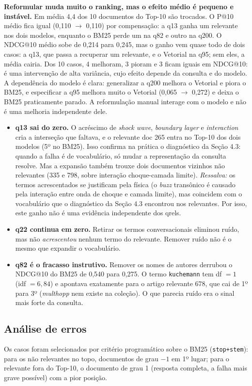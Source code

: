 \documentclass[10pt,a4paper]{article}
\newcommand{\term}[1]{\texttt{#1}}         %
\begin{document}
\textbf{Reformular muda muito o ranking, mas o efeito médio é pequeno e instável.} Em média 4,4
dos 10 documentos do Top-10 são trocados. O P@10 médio fica igual (0,110 $\to$ 0,110) por
compensação: a q13 ganha um relevante nos dois modelos, enquanto o BM25 perde um na q82 e outro
na q200. O NDCG@10 médio sobe de 0,214 para 0,245, mas o ganho vem quase todo de dois casos: a
q13, que passa a recuperar um relevante, e o Vetorial na q95; sem eles, a média cairia. Dos 10
casos, 4 melhoram, 3 pioram e 3 ficam iguais em NDCG@10: é uma intervenção de alta variância, cujo
efeito depende da consulta e do modelo. A dependência do modelo é clara: generalizar a q200
melhora o Vetorial e piora o BM25, e especificar a q95 melhora muito o Vetorial
(0,065 $\to$ 0,272) e deixa o BM25 praticamente parado. A reformulação manual interage com o
modelo e não é uma melhoria independente dele.
\begin{itemize}
  \item \textbf{q13 sai do zero.} O acréscimo de \emph{shock wave}, \emph{boundary layer} e
  \emph{interaction} cria a interseção que faltava, e o relevante doc 265 entra no Top-10 dos dois
  modelos (5º no BM25). Isso confirma na prática o diagnóstico da Seção 4.3: quando a falha é de
  vocabulário, só mudar a representação da consulta resolve. Mas a expansão também trouxe dois
  documentos vizinhos não relevantes (335 e 798, sobre interação choque-camada limite).
  \emph{Ressalva:} os termos acrescentados se justificam pela física (o \emph{buzz} transônico é
  causado pela interação entre onda de choque e camada limite), mas coincidem com o vocabulário que
  o diagnóstico da Seção 4.3 encontrou nos relevantes. Por isso, este ganho não é uma evidência
  independente dos qrels.
  \item \textbf{q22 continua em zero.} Retirar os termos conversacionais eliminou ruído, mas não
  \emph{acrescentou} nenhum termo do relevante. Remover ruído não é o mesmo que expandir o
  vocabulário.
  \item \textbf{q82 é o fracasso instrutivo.} Remover os nomes de autores derrubou o NDCG@10 do
  BM25 de 0,540 para 0,275. O termo \term{kuchemann} tem df $=1$ (idf $=6{,}84$) e apontava
  exatamente para o artigo relevante 678, que cai de 1º para 3º (\emph{multhopp} nem existe na
  coleção). O que parecia ruído era o sinal mais forte da consulta.
\end{itemize}

\subsection{Análise de erros}
Os casos foram selecionados por critério programático sobre o BM25 (\texttt{stop+stem}): para os
não relevantes no topo, documentos de grau $-1$ em 1º lugar; para o relevante fora do Top-10, o
documento de grau 1 (resposta completa, a falha mais grave possível) com a pior posição.
\end{document}
